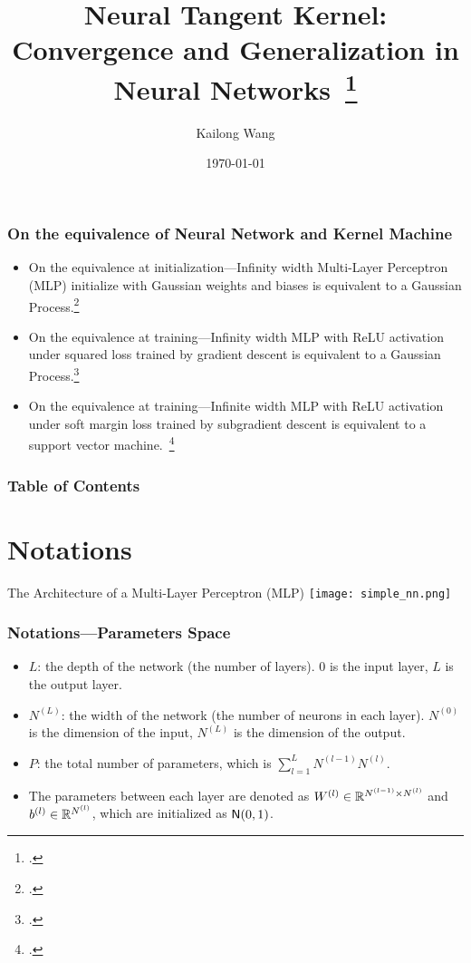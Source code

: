 \documentclass[10pt]{../formats/RU}
\title[Neural Tangent Kernel]{Neural Tangent Kernel: Convergence and Generalization in Neural Networks~\footcite{Jacot2020}
}
\author[Kai] %
{Kailong Wang\inst{$\dagger$}
}
\institute[Rutgers] %
{
    \inst{$\dagger$}%
    Rutgers University
}
\date[\today] %
{
    \today
}
\begin{document}
\frame{\titlepage}

\begin{frame}
    \frametitle{On the equivalence of Neural Network and Kernel Machine}
    \begin{itemize}
        \item On the equivalence at initialization---Infinity width Multi-Layer Perceptron (MLP) initialize with Gaussian weights and biases is equivalent to a Gaussian Process.\footcite{Lee2018}
        \item On the equivalence at training---Infinity width MLP with ReLU activation under squared loss trained by gradient descent is equivalent to a Gaussian Process.\footcite{Jacot2020}
        \item On the equivalence at training---Infinite width MLP with ReLU activation under soft margin loss trained by subgradient descent is equivalent to a support vector machine.~\footcite{Chen2021}
    \end{itemize}
\end{frame}

\begin{frame}
\frametitle{Table of Contents}
\tableofcontents
\end{frame}


\section{Notations}
\begin{frame}
    {The Architecture of a Multi-Layer Perceptron (MLP)}
    \texttt{[image: simple\_nn.png]}
\end{frame}

\begin{frame}
    \frametitle{Notations---Parameters Space}
    \begin{itemize}
        \item $L$: the depth of the network (\aka the number of layers). \Eg $0$ is the input layer, $L$ is the output layer.
        \item $N^{(L)}$: the width of the network (\aka the number of neurons in each layer). \Eg $N^{(0)}$ is the dimension of the input, $N^{(L)}$ is the dimension of the output.
        \item $P$: the total number of parameters, which is $\sum_{l=1}^L N^{(l-1)}N^{(l)}$.
        \item The parameters between each layer are denoted as $W^{(l)}\in\mathbb{R}^{N^{(l-1)}\times N^{(l)}}$ and $b^{(l)}\in\mathbb{R}^{N^{(l)}}$, which are initialized as \iid $\mathsf{N}(0,1)$.
    \end{itemize}
\end{frame}
\end{document}
